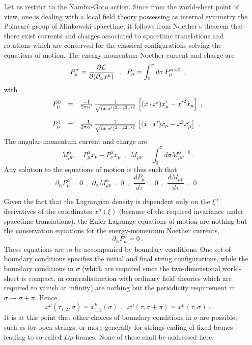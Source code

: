 \documentclass[a4paper,11pt]{article}
\begin{document}
Let us restrict to the Nambu-Goto action. Since from the world-sheet
point of view, one is dealing with a local field theory possessing as
internal symmetry the Poincar\'e group of Minkowski spacetime,
it follows from Noether's theorem that there exist currents and charges
associated to spacetime translations and rotations which are conserved
for the classical con\-fi\-gu\-ra\-tions solving the equations of motion.
The energy-momentum Noether current and charge are
\begin{equation}
P^\alpha_\mu=\frac{\partial{\cal L}}{\partial(\partial_\alpha x^\mu)}\ \ ,\ \ 
P_\mu=\int_0^\pi d\sigma\,P^{\alpha=0}_\mu\ ,
\end{equation}
with
\begin{equation}
\begin{array}{r c l}
P^0_\mu&=&\frac{-1}{2\pi\alpha'}\,
\frac{1}{\sqrt{(\dot{x}\cdot x')^2-\dot{x}^2 {x'}^2}}\,
\left[(\dot{x}\cdot x')x'_\mu-{x'}^2\dot{x}_\mu\right]\ ,\\
 & & \\
P^1_\mu&=&\frac{-1}{2\pi\alpha'}\,
\frac{1}{\sqrt{(\dot{x}\cdot x')^2-\dot{x}^2 {x'}^2}}\,
\left[(\dot{x}\cdot x')\dot{x}_\mu-\dot{x}^2x'_\mu\right]\ .
\end{array}
\end{equation}
The angular-momentum current and charge are
\begin{equation}
M^\alpha_{\mu\nu}=P^\alpha_\mu x_\nu - P^\alpha_\nu x_\mu\ \ ,\ \ 
M_{\mu\nu}=\int_0^\pi d\sigma M^{\alpha=0}_{\mu\nu}\ .
\end{equation}
Any solution to the equations of motion is thus such that
\begin{equation}
\partial_\alpha P^\alpha_\mu=0\ \ ,\ \ 
\partial_\alpha M^\alpha_{\mu\nu}=0\ \ ,\ \ 
\frac{dP_\mu}{d\tau}=0\ \ ,\ \ 
\frac{dM_{\mu\nu}}{d\tau}=0\ .
\end{equation}

Given the fact that the Lagrangian density is dependent only on the
$\xi^\alpha$ derivatives of the coordinates $x^\mu(\xi)$ (because of
the required invariance under spacetime translations), the Euler-Lagrange
equations of motion are nothing but the conservation equations for the
energy-momentum Noether currents,
\begin{equation}
\partial_\alpha P^\alpha_\mu=0\ .
\end{equation}
These equations are to be accompanied by boundary conditions. One set of
boundary conditions specifies the initial and final string configurations,
while the boundary conditions in $\sigma$ (which are required since the
two-dimensional world-sheet is compact, in contradistinction with
ordinary field theories which are required to vanish at infinity) are
nothing but the periodicity requirement in $\sigma\rightarrow \sigma+\pi$.
Hence,
\begin{equation}
x^\mu(\tau_{1,2},\sigma)=x^\mu_{1,2}(\sigma)\ \ ,\ \ 
x^\mu(\tau,\sigma+\pi)=x^\mu(\tau,\sigma)\ .
\end{equation}
It is at this point that other choices of boundary conditions in $\sigma$
are possible, such as for open strings, or more generally for strings
ending of fixed branes leading to so-called $Dp$-branes.\cite{Pol} 
None of these shall be addressed here.
\end{document}
